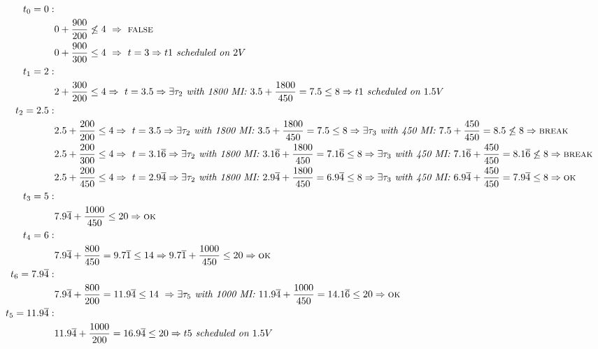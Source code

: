 \documentclass{article}
\begin{document}
	\begin{adjustwidth}{-8.5em}{}
		\begin{align*}
			t_0 = 0: & \\
			& 0 + \frac{900}{200} \not\leq 4 \ \Rightarrow \ \textsc{false} \\
			& 0 + \frac{900}{300} \leq 4 \ \Rightarrow \ t = 3 \Rightarrow t1 \textit{ scheduled on } 2V  \\
			t_1 = 2: & \\
			& 2 + \frac{300}{200} \leq 4 \Rightarrow \ t = 3.5 \Rightarrow \exists \tau_2 \textit{ with 1800 MI: } 3.5 + \frac{1800}{450} = 7.5 \leq 8  \Rightarrow t1 \textit{ scheduled on } 1.5V \\
			t_2 = 2.5: & \\
			& 2.5 + \frac{200}{200} \leq 4 \Rightarrow \ t = 3.5 \Rightarrow \exists \tau_2 \textit{ with 1800 MI: } 3.5 + \frac{1800}{450} = 7.5 \leq 8  \Rightarrow \exists \tau_3 \textit{ with 450 MI: } 7.5 + \frac{450}{450} = 8.5 \not\leq 8 \Rightarrow \textsc{break}\\
			& 2.5 + \frac{200}{300} \leq 4 \Rightarrow \ t = 3.1\overline{6} \Rightarrow \exists \tau_2 \textit{ with 1800 MI: } 3.1\overline{6} + \frac{1800}{450} = 7.1\overline{6} \leq 8  \Rightarrow \exists \tau_3 \textit{ with 450 MI: } 7.1\overline{6} + \frac{450}{450} = 8.1\overline{6} \not\leq 8 \Rightarrow \textsc{break}\\
			& 2.5 + \frac{200}{450} \leq 4 \Rightarrow \ t = 2.9\overline{4} \Rightarrow \exists \tau_2 \textit{ with 1800 MI: } 2.9\overline{4} + \frac{1800}{450} = 6.9\overline{4} \leq 8  \Rightarrow \exists \tau_3 \textit{ with 450 MI: } 6.9\overline{4} + \frac{450}{450} = 7.9\overline{4} \leq 8 \Rightarrow \textsc{ok}\\
			t_3 = 5: & \\
			& 7.9\overline{4} + \frac{1000}{450} \leq 20 \Rightarrow \textsc{ok} \\
			t_4 = 6: & \\
			& 7.9\overline{4} + \frac{800}{450} = 9.7\overline{1} \leq 14 \Rightarrow 9.7\overline{1} + \frac{1000}{450} \leq 20 \Rightarrow \textsc{ok} \\
			t_6 = 7.9\overline{4}: & \\
			& 7.9\overline{4} + \frac{800}{200} = 11.9\overline{4} \leq 14 \ \Rightarrow \exists \tau_5 \textit{ with 1000 MI: } 11.9\overline{4} + \frac{1000}{450} = 14.1\overline{6} \leq 20 \Rightarrow \textsc{ok} \\
			t_5 = 11.9\overline{4}: & \\
			& 11.9\overline{4} + \frac{1000}{200} = 16.9\overline{4} \leq 20 \Rightarrow t5 \textit{ scheduled on } 1.5V
		\end{align*}
	\end{adjustwidth}
\end{document}
